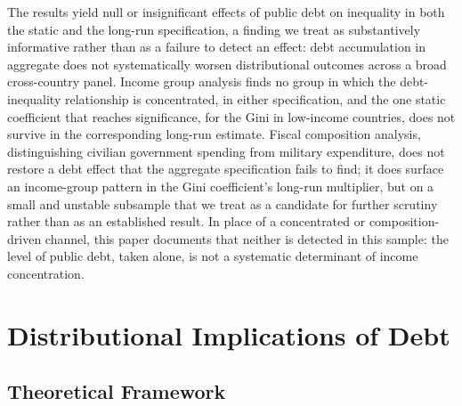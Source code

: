 \documentclass[12pt, titlepage]{article}
\numberwithin{equation}{section}
\begin{document}
The results yield null or insignificant effects of
public debt on inequality in both the static and the long-run specification, a
finding we treat as substantively informative rather than as a failure to
detect an effect: debt accumulation in aggregate does not systematically
worsen distributional outcomes across a broad cross-country panel. Income
group analysis finds no group in which the debt-inequality relationship is
concentrated, in either specification, and the one static coefficient that
reaches significance, for the Gini in low-income countries, does not survive
in the corresponding long-run estimate. Fiscal composition analysis,
distinguishing civilian government spending from military expenditure, does
not restore a debt effect that the aggregate specification fails to find; it
does surface an income-group pattern in the Gini coefficient's long-run
multiplier, but on a small and unstable subsample that we treat as a candidate
for further scrutiny rather than as an established result. In place of a
concentrated or composition-driven channel, this paper documents that neither
is detected in this sample: the level of public debt, taken alone, is not a
systematic determinant of income concentration.


	\section{Distributional Implications of Debt}
	\label{section:section2}
	\subsection{Theoretical Framework}
\end{document}
